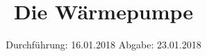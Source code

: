 

\subject{Versuch 206}
\title{Die Wärmepumpe}
\date{%
  Durchführung: 16.01.2018
  \hspace{3em}
  Abgabe: 23.01.2018
}



\maketitle
\thispagestyle{empty}
\tableofcontents
\newpage






\printbibliography{}


